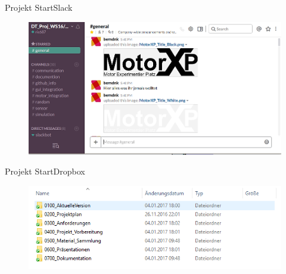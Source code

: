 \begin{frame}{Projekt Start}{Slack}
	\begin{figure} [htbp]
 		\centering
 		\includegraphics[scale=0.35]{../projectdefinition/Bilder/Slack.png}
	\end{figure}
\end{frame}
\begin{frame}{Projekt Start}{Dropbox}
	\begin{figure} [htbp]
 		\centering
 		\includegraphics[scale=0.5]{../projectdefinition/Bilder/FolderStructure.png}
	\end{figure}
\end{frame}